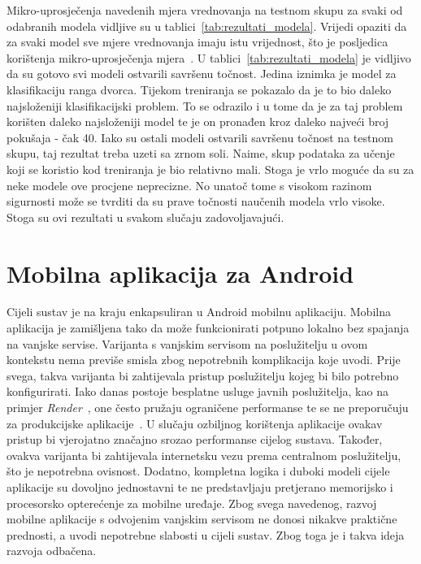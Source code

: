 \documentclass[diplomskirad]{fer}
\begin{document}
			Mikro-uprosječenja navedenih mjera vrednovanja na testnom skupu za svaki od odabranih modela vidljive su u tablici~\ref{tab:rezultati_modela}. Vrijedi opaziti da za svaki model sve mjere vrednovanja imaju istu vrijednost, što je posljedica korištenja mikro-uprosječenja mjera~\cite{Snajder2022VrednovanjeModela}. U tablici~\ref{tab:rezultati_modela} je vidljivo da su gotovo svi modeli ostvarili savršenu točnost. Jedina iznimka je model za klasifikaciju ranga dvorca. Tijekom treniranja se pokazalo da je to bio daleko najsloženiji klasifikacijski problem. To se odrazilo i u tome da je za taj problem korišten daleko najsloženiji model te je on pronađen kroz daleko najveći broj pokušaja - čak 40. Iako su ostali modeli ostvarili savršenu točnost na testnom skupu, taj rezultat treba uzeti sa zrnom soli. Naime, skup podataka za učenje koji se koristio kod treniranja je bio relativno mali. Stoga je vrlo moguće da su za neke modele ove procjene neprecizne. No unatoč tome s visokom razinom sigurnosti može se tvrditi da su prave točnosti naučenih modela vrlo visoke. Stoga su ovi rezultati u svakom slučaju zadovoljavajući.
			
	
	\section{Mobilna aplikacija za Android}
		Cijeli sustav je na kraju enkapsuliran u Android mobilnu aplikaciju. Mobilna aplikacija je zamišljena tako da može funkcionirati potpuno lokalno bez spajanja na vanjske servise. Varijanta s vanjskim servisom na poslužitelju u ovom kontekstu nema previše smisla zbog nepotrebnih komplikacija koje uvodi. Prije svega, takva varijanta bi zahtijevala pristup poslužitelju kojeg bi bilo potrebno konfigurirati. Iako danas postoje besplatne usluge javnih poslužitelja, kao na primjer \textit{Render}~\cite{Render}, one često pružaju ograničene performanse te se ne preporučuju za produkcijske aplikacije~\cite{Render}. U slučaju ozbiljnog korištenja aplikacije ovakav pristup bi vjerojatno značajno srozao performanse cijelog sustava. Također, ovakva varijanta bi zahtijevala internetsku vezu prema centralnom poslužitelju, što je nepotrebna ovisnost. Dodatno, kompletna logika i duboki modeli cijele aplikacije su dovoljno jednostavni te ne predstavljaju pretjerano memorijsko i procesorsko opterećenje za mobilne uređaje. Zbog svega navedenog, razvoj mobilne aplikacije s odvojenim vanjskim servisom ne donosi nikakve praktične prednosti, a uvodi nepotrebne slabosti u cijeli sustav. Zbog toga je i takva ideja razvoja odbačena.
		
\end{document}

